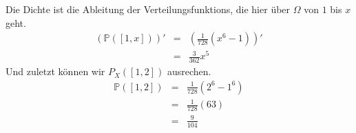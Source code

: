 \documentclass[11pt,a4paper,ngerman]{article}
\begin{document}
    Die Dichte ist die Ableitung der Verteilungsfunktions, die hier über $\Omega$ von $1$ bis $x$ geht.
\[
   \begin{array}{rcl}
        (\mathbb{P}([1,x]))'    &=& \left( \frac{1}{728} \left( x^6 - 1\right) \right)'\\
                                &=& \frac{3}{362} x^5
    \end{array}
\]
    Und zuletzt können wir $P_X([1,2])$ ausrechen.
\[
    \begin{array}{rcl}
        \mathbb{P}([1,2])   &=& \frac{1}{728} (2^6 - 1^6)\\
                            &=& \frac{1}{728} (63)\\
                            &=& \frac{9}{104}
    \end{array}
\]
\label{LastPage}
\end{document}
